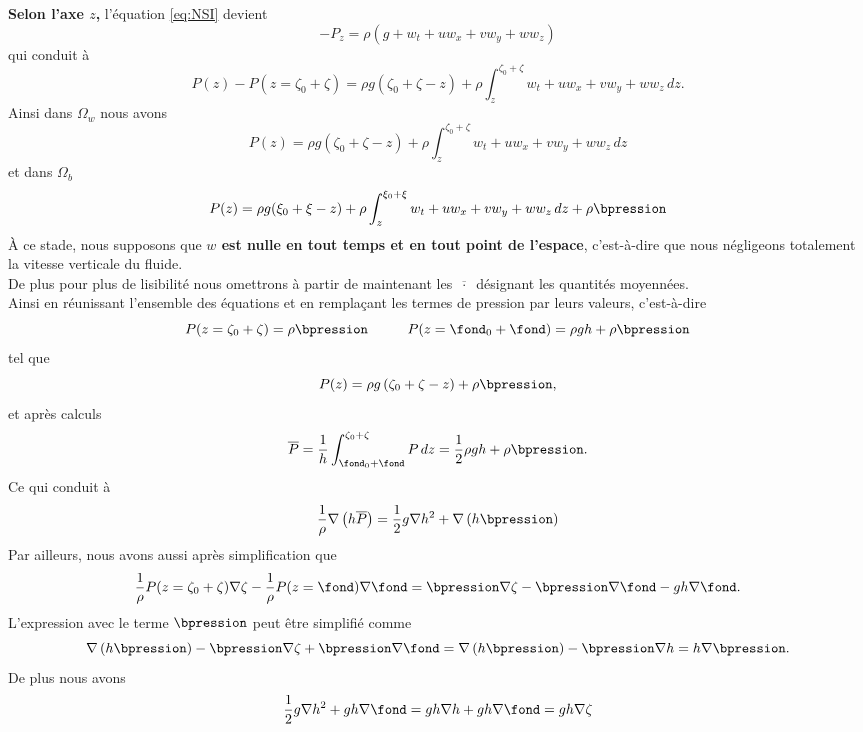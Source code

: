 \noindent \textbf{Selon l'axe $z$,} l'équation \eqref{eq:NSI} devient
\begin{equation}
	-P_z = \rho \left(g + w_t + uw_x + vw_y+ww_z\right)
\end{equation}
qui conduit à
\begin{equation}
	P(z) - P(z=\zeta_0+\zeta) = \rho g (\zeta_0 + \zeta - z) + \rho \int_{z}^{\zeta_0+\zeta} w_t + uw_x + vw_y +ww_z \,dz.
\end{equation}
Ainsi dans $\Omega_w$ nous avons
\begin{equation}
	P(z) = \rho g (\zeta_0 + \zeta - z) + \rho \int_{z}^{\zeta_0+\zeta} w_t + uw_x + vw_y +ww_z \,dz
\end{equation}
et dans $\Omega_b$
\begin{equation}
	P(z) = \rho g (\xi_0 + \xi - z) + \rho \int_{z}^{\xi_0+\xi} w_t + uw_x + vw_y +ww_z \,dz + \rho \bpression
\end{equation}
À ce stade, nous supposons que \textbf{$w$ est nulle en tout temps et en tout point de l'espace}, c'est-à-dire que nous négligeons totalement la vitesse verticale du fluide.\\
De plus pour plus de lisibilité nous omettrons à partir de maintenant les $\overline{~\cdot~}$ désignant les quantités moyennées.\\
Ainsi en réunissant l'ensemble des équations et en remplaçant les termes de pression par leurs valeurs, c'est-à-dire
\begin{equation*}
	P(z=\zeta_0+\zeta) = \rho\bpression\hspace{1cm}P(z=\fond_0+\fond) = \rho g h + \rho\bpression
\end{equation*}
tel que
\begin{equation}
	P(z) = \rho g \left(\zeta_0 + \zeta - z\right) + \rho\bpression, \label{eq:pression}
\end{equation}
et après calculs
\begin{equation}
	\overline{P} = \frac{1}{h}\int_{\fond_0 + \fond}^{\zeta_0 + \zeta} P\,dz = \frac{1}{2}\rho g h + \rho\bpression.\label{eq:barpression}
\end{equation}
Ce qui conduit à 
\begin{equation}
	\frac{1}{\rho} \nabla \left(h\overline{P}\right) = \frac{1}{2}g\nabla h^2 + \nabla\left(h\bpression\right)
\end{equation}
Par ailleurs, nous avons aussi après simplification que
\begin{equation}
	\frac{1}{\rho}P(z=\zeta_0+\zeta)\nabla\zeta -\frac{1}{\rho} P(z=\fond)\nabla\fond = \bpression \nabla \zeta -\bpression\nabla\fond - gh \nabla\fond.
\end{equation}
L'expression avec le terme $\bpression$ peut être simplifié comme 
\begin{equation}
	 \nabla\left(h\bpression\right) - \bpression \nabla\zeta + \bpression\nabla\fond = \nabla\left(h\bpression\right) - \bpression \nabla h = h\nabla\bpression.
\end{equation}
De plus nous avons
\begin{equation}
	\frac{1}{2}g\nabla h^2 + gh \nabla\fond = gh\nabla h + gh \nabla\fond = gh\nabla\zeta
\end{equation}


